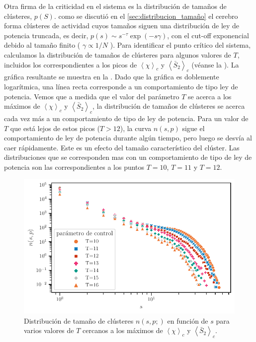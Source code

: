 Otra firma de la criticidad en el sistema es la distribución de tamaños de clústeres, $p(S)$. como se discutió en el \cref{sec:distribucion_tamaño} el  cerebro forma clústeres de actividad cuyos tamaños siguen una distribución de ley de potencia truncada, es decir, $p(s) \sim s^{-\tau}\exp\left(-s\gamma\right)$, con el cut-off exponencial debido al tamaño finito ( $\gamma \propto 1/ N$ ). Para identificar el punto crítico del sistema, calculamos la distribución de tamaños de clústeres para algunos valores de $T$, incluidos los correspondientes a los picos de $\left\langle\chi\right\rangle_c$ y $\left\langle\bar{S}_2\right\rangle_c$ (véanse la ).  La gráfica resultante se muestra en la . Dado que la gráfica es doblemente logarítmica, una línea recta corresponde a un comportamiento de tipo ley de potencia. Vemos que a medida que el valor del parámetro $T$ se acerca a los máximos de  $\left\langle\chi\right\rangle_c$ y $\left\langle\bar{S}_2\right\rangle_c$, la distribución de tamaños de clústeres  se acerca cada vez más a un comportamiento de tipo de ley de potencia. Para un valor de $T$ que está lejos de estos picos ($T>12$), la curva $n(s, p)$ sigue el comportamiento de ley de potencia durante algún tiempo, pero luego se desvía al caer rápidamente. Este es un efecto del tamaño característico del clúster. Las distribuciones que se corresponden mas con un comportamiento de tipo de ley de potencia  son las correspondientes a los puntos $T=10$, $T=11$ y $T=12$. 

\begin{figure}[h!]
	\centering\includegraphics[width=\imsize]{cerca_a_T_c.pdf}
	\caption[Distribución de tamaño de clústeres  $n(s, p;)$ en función de $s$ para varios valores de $T$ cercanos  a los máximos de $\left\langle\chi\right\rangle_c$  y $\left\langle\bar{S}_2\right\rangle_c$.   ]{Distribución de tamaño de clústeres  $n(s, p;)$ en función de $s$ para varios valores de $T$ cercanos  a los máximos de $\left\langle\chi\right\rangle_c$  y $\left\langle\bar{S}_2\right\rangle_c$.    } \label{fig:cerca_a_T_c}
\end{figure}


